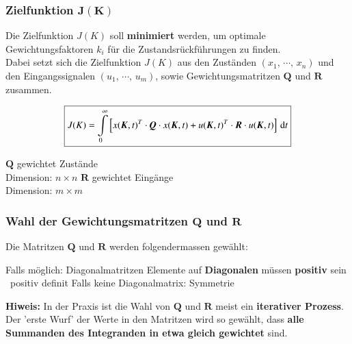 \subsubsection{Zielfunktion $\bm{J(K)}$}

Die Zielfunktion $J(K)$ soll \textbf{minimiert} werden, um optimale Gewichtungsfaktoren $k_i$ für die Zustandsrückführungen zu finden. \\
Dabei setzt sich die Zielfunktion $J(K)$ aus den Zuständen $(x_1, \, \cdots, \, x_n)$ und den Eingangssignalen $(u_1, \, \cdots, \, u_m)$, 
sowie Gewichtungsmatritzen $\bm{Q}$ und $\bm{R}$ zusammen.

\begin{minipage}[c]{0.69\columnwidth}
    $$ \boxed{J(K) = \int\limits_{0}^{\infty} \left[ x(\bm{K}, t)^T \cdot\bm{Q} \cdot x(\bm{K}, t) + u(\bm{K}, t)^T \cdot \bm{R} \cdot u(\bm{K}, t) \right] \, \mathop{} \! \mathrm{d} t } $$
\end{minipage}
\hfill
\begin{minipage}[c]{0.3\columnwidth}
    \begin{outline}
        \1 $\bm{Q}$ gewichtet Zustände \\
            Dimension: $n \times n$
            \smallskip
        \1 $\bm{R}$ gewichtet Eingänge \\
            Dimension: $m \times m$
    \end{outline}
\end{minipage}



\subsubsection{Wahl der Gewichtungsmatritzen $\bm{Q}$ und $\bm{R}$}

Die Matritzen $\bm{Q}$ und $\bm{R}$ werden folgendermassen gewählt:

\smallskip

\begin{outline}
    \1 Falls möglich: Diagonalmatritzen
        \2 Elemente auf \textbf{Diagonalen} müssen \textbf{positiv} sein \textrightarrow\ positiv definit
    \1 Falls keine Diagonalmatrix: Symmetrie
\end{outline}

\smallskip

\textbf{Hiweis:} In der Praxis ist die Wahl von $\bm{Q}$ und $\bm{R}$ meist ein \textbf{iterativer Prozess}. \\
Der 'erste Wurf' der Werte in den Matritzen wird so gewählt, dass \textbf{alle Summanden des Integranden in etwa gleich gewichtet} sind.


